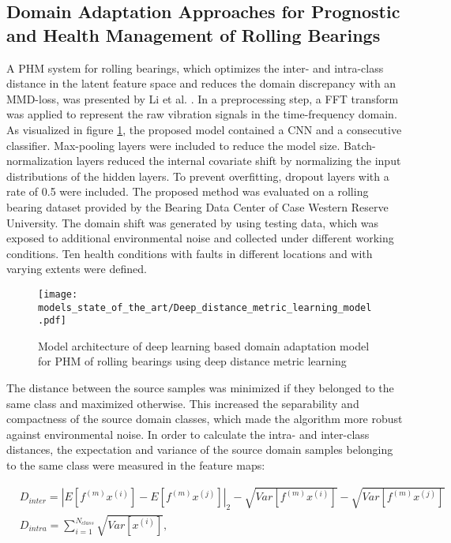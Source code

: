 \subsection{Domain Adaptation Approaches for Prognostic and Health Management of Rolling Bearings}

A PHM system for rolling bearings, which optimizes the inter- and intra-class distance in the latent feature space and reduces the domain discrepancy with an MMD-loss, was presented by Li et al. \cite{Li2018}. In a preprocessing step, a FFT transform was applied to represent the raw vibration signals in the time-frequency domain. As visualized in figure \ref{fig:Deep_distance_metric_learning_model}, the proposed model contained a CNN and a consecutive classifier. Max-pooling layers were included to reduce the model size. Batch-normalization layers reduced the internal covariate shift by normalizing the input distributions of the hidden layers. To prevent overfitting, dropout layers with a rate of 0.5 were included. The proposed method was evaluated on a rolling bearing dataset provided by the Bearing Data Center of Case Western Reserve University. The domain shift was generated by using testing data, which was exposed to additional environmental noise and collected under different working conditions. Ten health conditions with faults in different locations and with varying extents were defined. 

\begin{figure}[H]
  \centering
  \texttt{[image: models\_state\_of\_the\_art/Deep\_distance\_metric\_learning\_model.pdf]}
  \caption{Model architecture of deep learning based domain adaptation model for PHM of rolling bearings using deep distance metric learning \cite{Li2018}}
  \label{fig:Deep_distance_metric_learning_model}
\end{figure}

The distance between the source samples was minimized if they belonged to the same class and maximized otherwise. This increased the separability and compactness of the source domain classes, which made the algorithm more robust against environmental noise. In order to calculate the intra- and inter-class distances, the expectation and variance of the source domain samples belonging to the same class were measured in the feature maps:

\begin{equation}
    \begin{aligned}
       &D_{inter} = |E[f^{(m)}x^{(i)}]-E[f^{(m)}x^{(j)}]|_{2}-\sqrt{Var[f^{(m)}x^{(i)}]}-\sqrt{Var[f^{(m)}x^{(j)}]}\\
       &D_{intra} = 
        \sum_{i=1}^{N_{class}} \sqrt{Var[x^{(i)}]},
    \end{aligned}
\end{equation}

